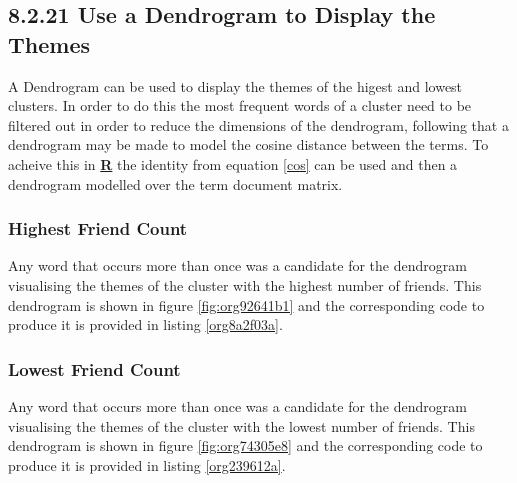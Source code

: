 \documentclass[11pt]{article}
\begin{document}
\subsection{8.2.21 Use a Dendrogram to Display the Themes}
\label{sec:org19daedf}
A Dendrogram can be used to display the themes of the higest and lowest
clusters. In order to do this the most frequent words of a cluster need to be
filtered out in order to reduce the dimensions of the dendrogram, following that
a dendrogram may be made to model the cosine distance between the terms. To
acheive this in \textbf{\textbf{\uline{R}}} the identity from equation \eqref{cos} can be used and
then a dendrogram modelled over the term document matrix.


\subsubsection{Highest Friend Count}
\label{sec:orgf0dab28}
Any word that occurs more than once was a candidate for the dendrogram visualising the themes of the cluster with the highest number of friends. This dendrogram is shown in figure \ref{fig:org92641b1} and the corresponding code to produce it is provided in listing \ref{org8a2f03a}.

\subsubsection{Lowest Friend Count}
\label{sec:org7d55854}
Any word that occurs more than once was a candidate for the dendrogram visualising the themes of the cluster with the lowest number of friends. This dendrogram is shown in figure \ref{fig:org74305e8} and the corresponding code to produce it is provided in listing \ref{org239612a}.
\end{document}
